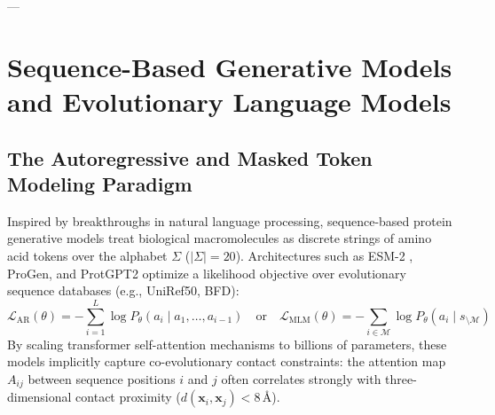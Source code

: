 ---

\section{Sequence-Based Generative Models and Evolutionary Language Models}
\label{sec:sequence_models}

\subsection{The Autoregressive and Masked Token Modeling Paradigm}
Inspired by breakthroughs in natural language processing, sequence-based protein generative models treat biological macromolecules as discrete strings of amino acid tokens over the alphabet $\Sigma$ ($|\Sigma| = 20$). Architectures such as ESM-2 \cite{lin2023evolutionary}, ProGen, and ProtGPT2 \cite{ferruz2022protgpt2} optimize a likelihood objective over evolutionary sequence databases (e.g., UniRef50, BFD):
\begin{equation}
    \mathcal{L}_{\text{AR}}(\theta) = -\sum_{i=1}^L \log P_\theta(a_i \mid a_1, \dots, a_{i-1}) \quad \text{or} \quad \mathcal{L}_{\text{MLM}}(\theta) = -\sum_{i \in \mathcal{M}} \log P_\theta(a_i \mid s_{\setminus \mathcal{M}})
\end{equation}
By scaling transformer self-attention mechanisms to billions of parameters, these models implicitly capture co-evolutionary contact constraints: the attention map $A_{ij}$ between sequence positions $i$ and $j$ often correlates strongly with three-dimensional contact proximity ($d(\mathbf{x}_i, \mathbf{x}_j) < 8\,\text{\AA}$).

